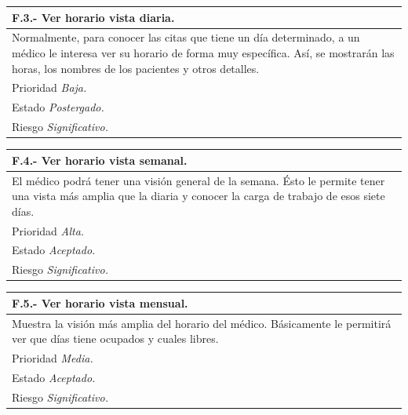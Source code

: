 \documentclass[a4paper,oneside,11pt]{book}
\begin{document}
\begin{center}
\begin{tabulary}{15cm}{|L|}
	\hline
		\bf{F.3.- Ver horario vista diaria.} \\
	\hline
		Normalmente, para conocer las citas que tiene un día determinado, a un médico le interesa ver su horario de forma muy específica. Así, se mostrarán las horas, los nombres de los pacientes y otros detalles. \\
	\hline
		Prioridad \textit{Baja.} \\
	\hline
		Estado \textit{Postergado.} \\
	\hline
		Riesgo \textit{Significativo.} \\
	\hline
\end{tabulary}
\end{center}

\begin{center}
\begin{tabulary}{15cm}{|L|}
	\hline
		\bf{F.4.- Ver horario vista semanal.} \\
	\hline
		El médico podrá tener una visión general de la semana. Ésto le permite tener una vista más amplia que la diaria y conocer la carga de trabajo de esos siete días. \\
	\hline
		Prioridad \textit{Alta.} \\
	\hline
		Estado \textit{Aceptado.} \\
	\hline
		Riesgo \textit{Significativo.} \\
	\hline
\end{tabulary}
\end{center}

\begin{center}
\begin{tabulary}{15cm}{|L|}
	\hline
		\bf{F.5.- Ver horario vista mensual.} \\
	\hline
		Muestra la visión más amplia del horario del médico. Básicamente le permitirá ver que días tiene ocupados y cuales libres. \\
	\hline
		Prioridad \textit{Media.} \\
	\hline
		Estado \textit{Aceptado.} \\
	\hline
		Riesgo \textit{Significativo.} \\
	\hline
\end{tabulary}
\end{center}
\end{document}
